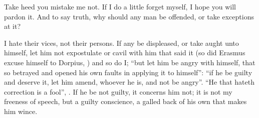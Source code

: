 
Take heed you mistake me not. If I do a little forget myself, I hope you will
pardon it. And to say truth, why should any man be offended, or take exceptions
at it?


I hate their vices, not their persons. If any be displeased, or take aught unto
himself, let him not expostulate or cavil with him that said it (so did
Erasmus excuse himself to Dorpius, ) and so do I; \enquote{but let him be angry with himself, that so
betrayed and opened his own faults in applying it to himself}:
\enquote{if he be guilty and deserve it, let him amend, whoever he
is, and not be angry}. \enquote{He that hateth correction is a fool}, . If he be not guilty, it concerns him not; it is not my freeness
of speech, but a guilty conscience, a galled back of his own that makes him
wince.


